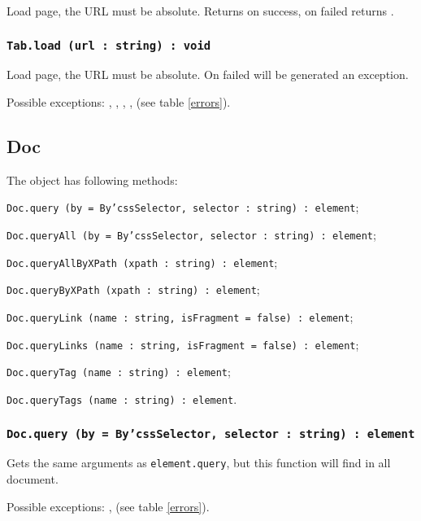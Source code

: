 Load page, the URL must be absolute. Returns \true{} on success, on failed returns \false.

\subsubsection{\texttt{Tab.load (url : string) : void}}

Load page, the URL must be absolute. On failed will be generated an exception.

Possible exceptions: , , , ,  (see table \ref{errors}).

\subsection{Doc}

The object \dom{} has following methods:
\begin{icItems}
	\item \texttt{Doc.query (by = By'cssSelector, selector : string) : element};
	\item \texttt{Doc.queryAll (by = By'cssSelector, selector : string) : element};
	\item \texttt{Doc.queryAllByXPath (xpath : string) : element};
	\item \texttt{Doc.queryByXPath (xpath : string) : element};
	\item \texttt{Doc.queryLink (name : string, isFragment = false) : element};
	\item \texttt{Doc.queryLinks (name : string, isFragment = false) : element};
	\item \texttt{Doc.queryTag (name : string) : element};
	\item \texttt{Doc.queryTags (name : string) : element}.
\end{icItems}

\subsubsection{\texttt{Doc.query (by = By'cssSelector, selector : string) : element}}

Gets the same arguments as \texttt{element.query}, but this function will find in all document.

Possible exceptions: ,  (see table \ref{errors}).


